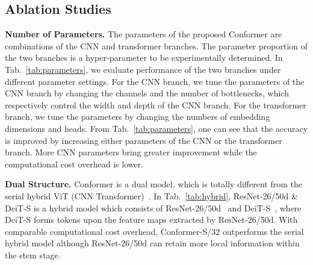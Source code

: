 \documentclass[10pt,twocolumn,letterpaper]{article}
\begin{document}
\subsection{Ablation Studies}

\noindent\textbf{Number of Parameters.}
The parameters of the proposed Conformer are combinations of the CNN and transformer branches. The parameter proportion of the two branches is a hyper-parameter to be experimentally determined.
In Tab.~\ref{tab:parameters}, we evaluate performance of the two branches under different parameter settings. For the CNN branch, we tune the parameters of the CNN branch by changing the channels and the number of bottlenecks, which respectively control the width and depth of the CNN branch. For the transformer branch, we tune the parameters by changing the numbers of embedding dimensions and heads. From Tab.~\ref{tab:parameters}, one can see that the accuracy is improved by increasing either parameters of the CNN or the transformer branch. More CNN parameters bring greater improvement while the computational cost overhead is lower. 


\noindent\textbf{Dual Structure.}
Conformer is a dual model, which is totally different from the serial hybrid ViT (CNN  Transformer)~\cite{ViT2020}. In Tab.~\ref{tab:hybrid}, ResNet-26/50d \& DeiT-S is a hybrid model which consists of ResNet-26/50d~\cite{ResNet2016} and DeiT-S~\cite{DeiT2020}, where DeiT-S forms tokens upon the feature maps extracted by ResNet-26/50d. With comparable computational cost overhead, Conformer-S/32 outperforms the serial hybrid model although ResNet-26/50d can retain more local information within the stem stage.
~\\
\end{document}
